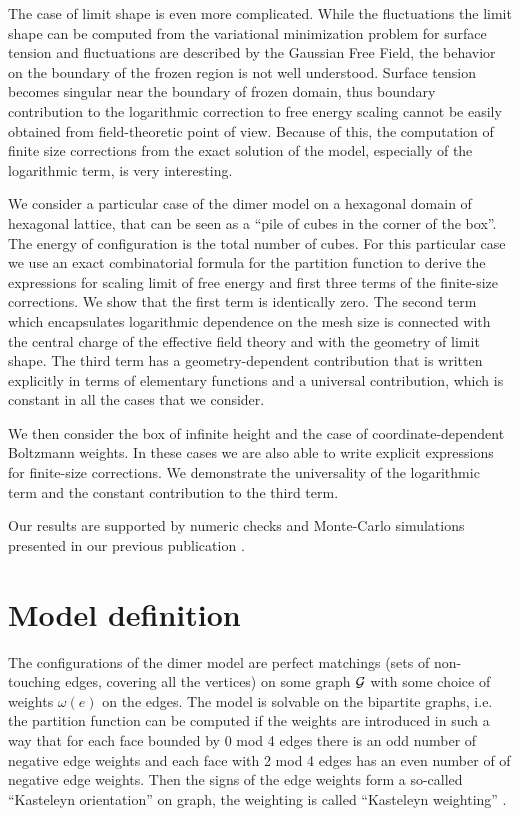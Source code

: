 \documentclass{article}
\begin{document}
The case of limit shape is even more complicated. While the fluctuations the limit shape can be
computed from the variational minimization problem for surface tension and fluctuations are
described by the Gaussian Free Field, the behavior on the boundary of the frozen region is not well
understood. Surface tension becomes singular near the boundary of frozen domain, thus boundary
contribution to the logarithmic correction to free energy scaling cannot be easily obtained from
field-theoretic point of view. Because of this, the computation of finite size corrections from the
exact solution of the model, especially of the logarithmic term, is very interesting. 

We consider a particular case of the dimer model on a hexagonal domain
of hexagonal lattice, that can be seen as a ``pile of cubes in the
corner of the box''. The energy of configuration is the total number
of cubes. For this particular case we use an exact combinatorial
formula for the partition function to derive the expressions for
scaling limit of free energy and first three terms of the finite-size
corrections. We show that the first term is identically zero. The
second term which encapsulates logarithmic dependence on the mesh size
is connected with the central charge of the effective field theory and
with the geometry of limit shape. The third term has a
geometry-dependent contribution that is written explicitly in terms of
elementary functions and a universal contribution, which is constant
in all the cases that we consider.

We then consider the box of infinite height and the case of
coordinate-dependent Boltzmann weights. In these cases we are also
able to write explicit expressions for finite-size corrections. We
demonstrate the universality of the logarithmic term and the constant
contribution to the third term.

Our results are supported by numeric checks and Monte-Carlo
simulations presented in our previous publication
\cite{1742-6596-1135-1-012024}.

\section{Model definition}
\label{sec:model-definition}
The configurations of the dimer model are perfect matchings (sets of non-touching edges, covering
all the vertices) on some graph ${\cal G}$ with some choice of weights $\omega(e)$ on the edges. The
model is solvable on the bipartite graphs, i.e. the partition function can be computed if the
weights are introduced in such a way that for each face bounded by 0 mod 4 edges there is an odd
number of negative edge weights and each face with 2 mod 4 edges has an even number of of negative
edge weights. Then the signs of the edge weights form a so-called ``Kasteleyn orientation'' on graph,
the weighting is called ``Kasteleyn weighting'' \cite{kenyon2001dominos,kenyon2009lectures}.
\end{document}
